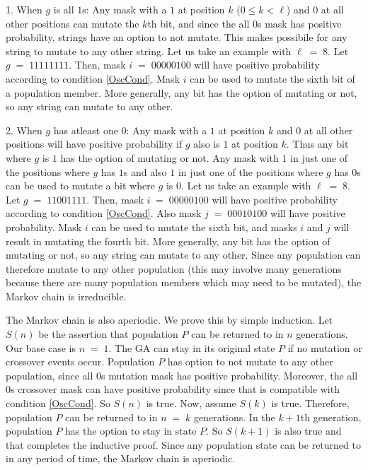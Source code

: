 1. When $g$ is all $1$s:\newline
Any mask with a $1$ at position $k$ ($0 \leq k < \ell$) and $0$ at all other positions can mutate the $k$th bit, and since the 
all $0$s mask has positive probability, strings have an option to not mutate. This makes possibile for any string to mutate to 
any other string. Let us take an example with $\ell \;=\; 8$. Let $g \;=\; 11111111$. Then, mask 
$i \;=\; 00000100$ will have positive probability according to condition \ref{OscCond}. 
Mask $i$ can be used to mutate the sixth bit of a population member. More generally, 
any bit has the option of mutating or not, so any string can mutate to any other.

2. When $g$ has atleast one $0$:\newline
Any mask with a $1$ at position $k$ and $0$ at all other positions  
will have positive probability if $g$ also is $1$ at position $k$. Thus any bit where $g$ is $1$ has the option of mutating or not.  
Any mask with $1$ in just one of the positions where $g$ has $1$s and also $1$ in just one of the positions where $g$ has $0$s can be used to 
mutate a bit where $g$ is $0$. Let us take an example with $\ell \;=\; 8$. Let $g \;=\; 11001111$. Then, 
mask $i \;=\; 00000100$ will have positive probability according to condition \ref{OscCond}. Also mask 
$j \;=\; 00010100$ will have positive probability. Mask $i$ can be used to mutate the sixth bit, and masks $i$ and $j$ will result in mutating
the fourth bit. More generally, any bit has the option of mutating or not, so any string can mutate to any other. Since any population can therefore 
mutate to any other population (this may involve many generations because there are many population members which may need to be mutated), the Markov 
chain is irreducible.

The Markov chain is also aperiodic. We prove this by simple induction. 
Let $S(n)$ be the assertion that population $P$ can be returned to in $n$ generations. 
Our base case is $n \;=\; 1$. The GA can stay in its original state $P$ if no mutation or crossover events occur. 
Population $P$ has option to not mutate to any other population, since all $0$s mutation mask 
has positive probability. Moreover, the all $0$s crossover mask can have positive probability since 
that is compatible with condition \ref{OscCond}.
So $S(n)$ is true. Now, assume $S(k)$ is true. Therefore, population $P$ can be returned to in $n \;= \;k$ generations. 
In the $k+1$th generation, population $P$ has the option to stay in state $P$. 
So $S(k+1)$ is also true and that completes the inductive proof. 
Since any population state can be returned to in any period of time, the Markov chain is aperiodic. 

